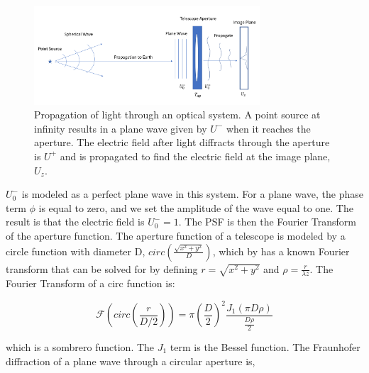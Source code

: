 \begin{figure}
    \centering
    \includegraphics[width=0.75\textwidth]{Chapter Materials/Introduction Materials/Introduction Figures/Propagation.png}
    \caption{Propagation of light through an optical system. A point source at infinity results in a plane wave given by $U^-$ when it reaches the aperture. The electric field after light diffracts through the aperture is $U^+$ and is propagated to find the electric field at the image plane, $U_z$.}
    \label{fig:propagation}
\end{figure}

$U_0^-$ is modeled as a perfect plane wave in this system. For a plane wave, the phase term $\phi$ is equal to zero, and we set the amplitude of the wave equal to one. The result is that the electric field is $U_0^-=1$. The PSF is then the Fourier Transform of the aperture function. The aperture function of a telescope is modeled by a circle function with diameter D, $circ(\frac{\sqrt{x^2+y^2}}{D})$, which by has a known Fourier transform that can be solved for by defining $r=\sqrt{x^2+y^2}$ and $\rho=\frac{r}{\lambda z}$. The Fourier Transform of a circ function is:



\begin{equation}
    \mathcal{F}\left(circ\left(\frac{r}{D/2}\right)\right)=\pi{\left(\frac{D}{2}\right)}^2 \frac{J_1(\pi D \rho)}{\frac{D\rho}{2}}
\end{equation}

\noindent which is a sombrero function. The $J_1$ term is the Bessel function. The Fraunhofer diffraction of a plane wave through a circular aperture is, 

